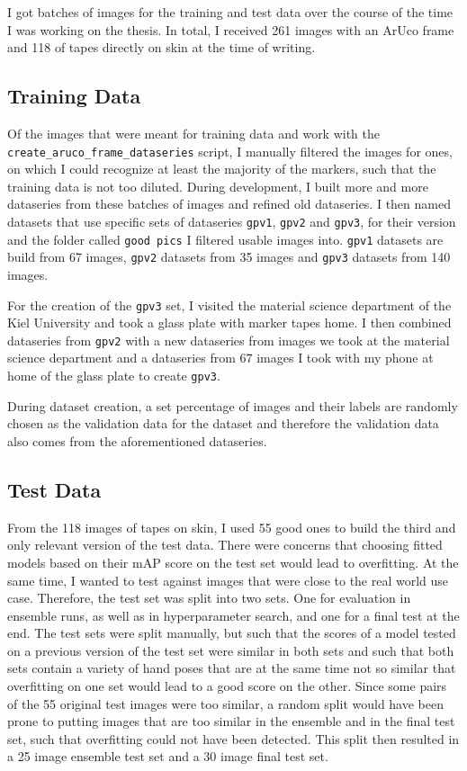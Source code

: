 \documentclass[10pt]{book}
\begin{document}
I got batches of images for the training and test data over the course of the time I was working on the thesis. In total, I received 261 images with an \ac{ArUco} frame and 118 of tapes directly on skin at the time of writing. 

\subsection{Training Data}

Of the images that were meant for training data and work with the \texttt{create\_aruco\_frame\_dataseries} script, I manually filtered the images for ones, on which I could recognize at least the majority of the markers, such that the training data is not too diluted. During development, I built more and more dataseries from these batches of images and refined old dataseries. I then named datasets that use specific sets of dataseries \texttt{gpv1}, \texttt{gpv2} and \texttt{gpv3}, for their version and the folder called \texttt{good pics} I filtered usable images into. \texttt{gpv1} datasets are build from 67 images, \texttt{gpv2} datasets from 35 images and \texttt{gpv3} datasets from 140 images. 

For the creation of the \texttt{gpv3} set, I visited the material science department of the Kiel University and took a glass plate with marker tapes home. I then combined dataseries from \texttt{gpv2} with a new dataseries from images we took at the material science department and a dataseries from 67 images I took with my phone at home of the glass plate to create \texttt{gpv3}.

During dataset creation, a set percentage of images and their labels are randomly chosen as the validation data for the dataset and therefore the validation data also comes from the aforementioned dataseries.

\subsection{Test Data}

From the 118 images of tapes on skin, I used 55 good ones to build the third and only relevant version of the test data. There were concerns that choosing fitted models based on their \ac{mAP} score on the test set would lead to overfitting. At the same time, I wanted to test against images that were close to the real world use case. Therefore, the test set was split into two sets. One for evaluation in ensemble runs, as well as in hyperparameter search, and one for a final test at the end. The test sets were split manually, but such that the scores of a model tested on a previous version of the test set were similar in both sets and such that both sets contain a variety of hand poses that are at the same time not so similar that overfitting on one set would lead to a good score on the other. Since some pairs of the 55 original test images were too similar, a random split would have been prone to putting images that are too similar in the ensemble and in the final test set, such that overfitting could not have been detected. This split then resulted in a 25 image ensemble test set and a 30 image final test set.
\end{document}
